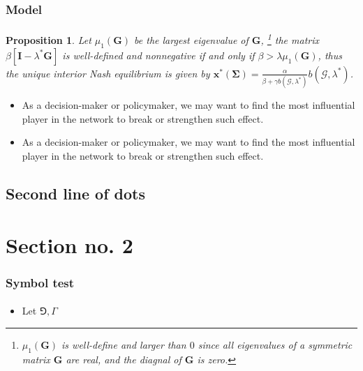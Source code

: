 \documentclass{beamer}
\newtheorem{propo}{Proposition}
\begin{document}
\begin{frame}[label=current]
    \frametitle{Model}
    \framesubtitle{}
    \begin{propo}
        Let $\mu_1(\bm{G})$ be the largest eigenvalue of $\bm{G}$,
        \footnote{$\mu_1(\bm{G})$ is well-define and larger than $0$ since all eigenvalues
        of a symmetric matrix $\bm{G}$ are real, and the diagnal of $\bm{G}$ is zero.}
        the matrix $\beta[\bm{I}-\lambda^*\bm{G}]$ is well-defined and nonnegative
        if and only if $\beta>\lambda\mu_1(\bm{G})$, thus the unique interior Nash equilibrium
        is given by $\bm{x}^*(\bm{\Sigma})=\frac{\alpha}{\beta+\gamma b(\mathscr{G},\lambda^*)}
        b(\mathscr{G},\lambda^*)$.
    \end{propo}
    \begin{itemize}
        \item As a decision-maker or policymaker, we may want to find the most
        influential player in the network to break or strengthen such effect.
        \item As a decision-maker or policymaker, we may want to find the most
           influential player in the network to break or strengthen such effect.
    \end{itemize}
\end{frame}
\subsection{Second line of dots} %

\section{Section no. 2} 

\begin{frame}[label=current]
  \frametitle{Symbol test}
  \framesubtitle{}
  \begin{itemize}
    \item Let $\Game, \varGamma$
  \end{itemize}
\end{frame}

\begin{frame}[allowframebreaks]
    
\end{frame}
\end{document}
